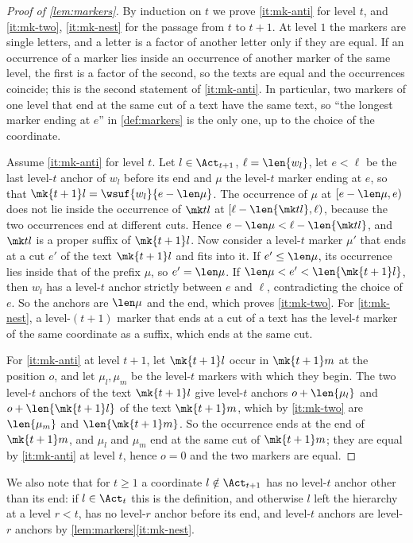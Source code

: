 \begin{proof}[Proof of \cref{lem:markers}]
By induction on $t$ we prove \eqref{it:mk-anti} for level $t$, and
\eqref{it:mk-two}, \eqref{it:mk-nest} for the passage from $t$ to $t+1$. At
level $1$ the markers are single letters, and a letter is a factor of another
letter only if they are equal. If an occurrence of a marker lies inside an
occurrence of another marker of the same level, the first is a factor of the
second, so the texts are equal and the occurrences coincide; this is the
second statement of \eqref{it:mk-anti}. In particular, two markers of one
level that end at the same cut of a text have the same text, so ``the
longest marker ending at $e$'' in \cref{def:markers} is the only one, up to
the choice of the coordinate.

Assume \eqref{it:mk-anti} for level $t$. Let $l\in\Act_{t+1}$, $\ell=\len{w_l}$,
let $e<\ell$ be the last level-$t$ anchor of $w_l$ before its end and $\mu$ the
level-$t$ marker ending at $e$, so that $\mk{t+1}l=\wsuf{w_l}{e-\len\mu}$.
The occurrence of $\mu$ at $[e-\len\mu,e)$ does not lie inside the occurrence
of $\mk tl$ at $[\ell-\len{\mk tl},\ell)$, because the two occurrences end at
different cuts. Hence $e-\len\mu<\ell-\len{\mk tl}$, and $\mk tl$ is a proper
suffix of $\mk{t+1}l$. Now consider a level-$t$ marker $\mu'$ that ends at a
cut $e'$ of the text $\mk{t+1}l$ and fits into it. If $e'\le\len\mu$, its
occurrence lies inside that of the prefix $\mu$, so $e'=\len\mu$. If
$\len\mu<e'<\len{\mk{t+1}l}$, then $w_l$ has a level-$t$ anchor strictly
between $e$ and $\ell$, contradicting the choice of $e$. So the anchors are
$\len\mu$ and the end, which proves \eqref{it:mk-two}. For
\eqref{it:mk-nest}, a level-$(t+1)$ marker that ends at a cut of a text has
the level-$t$ marker of the same coordinate as a suffix, which ends at the
same cut.

For \eqref{it:mk-anti} at level $t+1$, let $\mk{t+1}l$ occur in $\mk{t+1}m$
at the position $o$, and let $\mu_l,\mu_m$ be the level-$t$ markers with
which they begin. The two level-$t$ anchors of the text $\mk{t+1}l$ give
level-$t$ anchors $o+\len{\mu_l}$ and $o+\len{\mk{t+1}l}$ of the text
$\mk{t+1}m$, which by \eqref{it:mk-two} are $\len{\mu_m}$ and
$\len{\mk{t+1}m}$. So the occurrence ends at the end of $\mk{t+1}m$, and
$\mu_l$ and $\mu_m$ end at the same cut of $\mk{t+1}m$; they are equal by
\eqref{it:mk-anti} at level $t$, hence $o=0$ and the two markers are equal.
\end{proof}

We also note that for $t\ge1$ a coordinate $l\notin\Act_{t+1}$ has no
level-$t$ anchor other than its end: if $l\in\Act_t$ this is the definition,
and otherwise $l$ left the hierarchy at a level $r<t$, has no level-$r$
anchor before its end, and level-$t$ anchors are level-$r$ anchors by
\cref{lem:markers}\eqref{it:mk-nest}.

